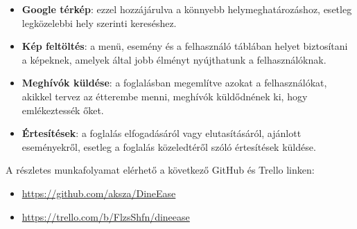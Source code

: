 \begin{itemize}
    \item \textbf{Google térkép}: ezzel hozzájárulva a könnyebb helymeghatározáshoz, esetleg legközelebbi hely szerinti kereséshez.

    \item \textbf{Kép feltöltés}: a menü, esemény és a felhasználó táblában helyet biztosítani a képeknek, amelyek által jobb élményt nyújthatunk a felhasználóknak.

    \item \textbf{Meghívók küldése}: a foglalásban megemlítve azokat a felhasználókat, akikkel tervez az étterembe menni, meghívók küldődnének ki, hogy emlékeztessék őket.

    \item \textbf{Értesítések}: a foglalás elfogadásáról vagy elutasításáról, ajánlott eseményekről, esetleg a foglalás közeledtéről szóló értesítések küldése.
    
\end{itemize}


A részletes munkafolyamat elérhető a következő GitHub és Trello linken: 
\begin{itemize}
    \item \href{https://github.com/aksza/DineEase}{https://github.com/aksza/DineEase}
    \item \href{https://trello.com/b/FlzsShfn/dineease}{https://trello.com/b/FlzsShfn/dineease}
\end{itemize}